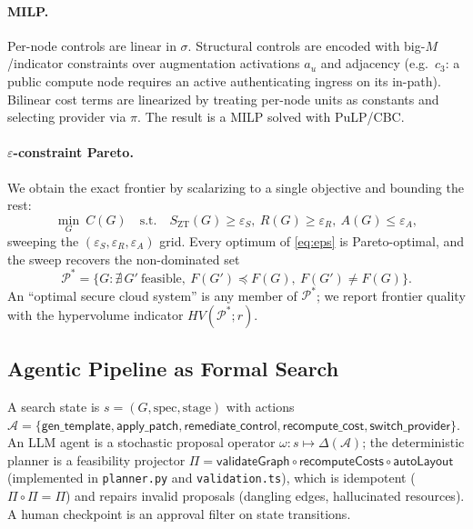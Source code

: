 \documentclass[journal]{IEEEtran}
\theoremstyle{plain}
\theoremstyle{definition}
\newcommand{\G}{G}
\newcommand{\Szt}{S_{\mathrm{ZT}}}
\newcommand{\code}[1]{\texttt{\small #1}}
\begin{document}
\paragraph{MILP.}
Per-node controls are linear in $\sigma$. Structural controls are encoded with
big-$M$/indicator constraints over augmentation activations $a_u$ and adjacency
(e.g.\ $c_3$: a public compute node requires an active authenticating ingress on
its in-path). Bilinear cost terms are linearized by treating per-node units as
constants and selecting provider via $\pi$. The result is a MILP solved with
PuLP/CBC.

\paragraph{$\varepsilon$-constraint Pareto.}
We obtain the exact frontier by scalarizing to a single objective and bounding
the rest:
\begin{equation}
\min_{\G}\ C(\G)\quad\text{s.t.}\quad \Szt(\G)\ge\varepsilon_S,\ R(\G)\ge\varepsilon_R,\ A(\G)\le\varepsilon_A,
\label{eq:eps}
\end{equation}
sweeping the $(\varepsilon_S,\varepsilon_R,\varepsilon_A)$ grid. Every optimum of
\eqref{eq:eps} is Pareto-optimal, and the sweep recovers the non-dominated set
\begin{equation}
\mathcal{P}^*=\{\G:\nexists\,\G'\ \text{feasible},\ F(\G')\preceq F(\G),\ F(\G')\neq F(\G)\}.
\label{eq:pareto}
\end{equation}
An ``optimal secure cloud system'' is any member of $\mathcal{P}^*$; we report
frontier quality with the hypervolume indicator $HV(\mathcal{P}^*;r)$.

\subsection{Agentic Pipeline as Formal Search}
A search state is $s=(\G,\text{spec},\text{stage})$ with actions
$\mathcal{A}=\{\textsf{gen\_template},\textsf{apply\_patch},\textsf{remediate\_control},\textsf{recompute\_cost},\textsf{switch\_provider}\}$.
An LLM agent is a stochastic proposal operator $\omega:s\mapsto\Delta(\mathcal{A})$;
the deterministic planner is a feasibility projector
$\Pi=\textsf{validateGraph}\circ\textsf{recomputeCosts}\circ\textsf{autoLayout}$
(implemented in \code{planner.py} and \code{validation.ts}), which is
idempotent ($\Pi\circ\Pi=\Pi$) and repairs invalid proposals (dangling edges,
hallucinated resources). A human checkpoint is an approval filter on state
transitions.
\end{document}
